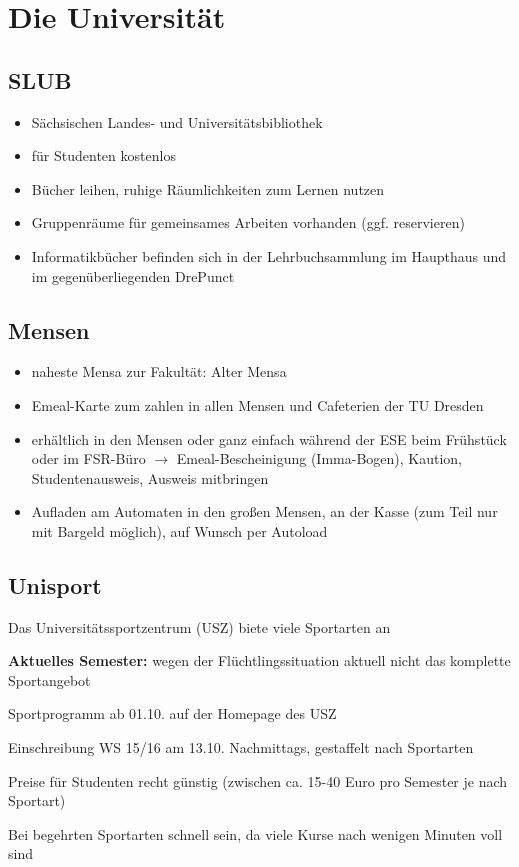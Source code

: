 \documentclass[a4paper,12pt]{report}
\begin{document}
\section{Die Universität}
\subsection{SLUB}
\begin{itemize}
	\item Sächsischen Landes- und Universitätsbibliothek
	\item für Studenten kostenlos
	\item Bücher leihen, ruhige Räumlichkeiten zum Lernen nutzen
	\item Gruppenräume für gemeinsames Arbeiten vorhanden (ggf. reservieren)
	\item Informatikbücher befinden sich in der Lehrbuchsammlung im Haupthaus und im gegenüberliegenden \glqq DrePunct\grqq
\end{itemize}

\subsection{Mensen}
\begin{itemize}
	\item naheste Mensa zur Fakultät: Alter Mensa
	\item Emeal-Karte zum zahlen in allen Mensen und Cafeterien der TU Dresden
	\item erhältlich in den Mensen oder ganz einfach während der ESE beim Frühstück oder im FSR-Büro
	$\rightarrow$ Emeal-Bescheinigung (Imma-Bogen),  Kaution, Studentenausweis, Ausweis mitbringen
	\item Aufladen am Automaten in den großen Mensen, an der Kasse (zum Teil nur mit Bargeld möglich), auf Wunsch per Autoload
\end{itemize}

\subsection{Unisport}
Das Universitätssportzentrum (USZ) biete viele Sportarten an
\begin{itemize*}
	\item \textbf{Aktuelles Semester:} wegen der Flüchtlingssituation aktuell nicht das komplette Sportangebot
	\item Sportprogramm ab 01.10. auf der Homepage des USZ
	\item Einschreibung WS 15/16 am 13.10. Nachmittags, gestaffelt nach Sportarten
	\item Preise für Studenten recht günstig (zwischen ca. 15-40 Euro pro Semester je nach Sportart)
	\item Bei begehrten Sportarten schnell sein, da viele Kurse nach wenigen Minuten voll sind
\end{itemize*}
\end{document}
